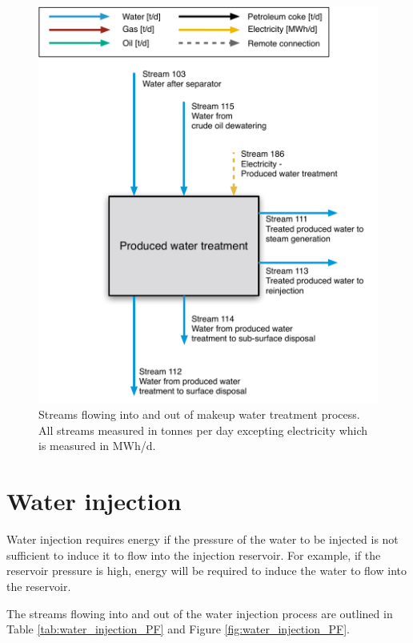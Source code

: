 \documentclass[11pt]{report}
\begin{document}
\begin{figure}
\includegraphics[width=0.8\columnwidth]{images/produced_water_treatment_PF.pdf}
\caption{Streams flowing into and out of makeup water treatment process. All streams measured in tonnes per day excepting electricity which is measured in MWh/d.}
\label{fig:makeup_water_treatment_PF}
\end{figure}

\clearpage



\section{Water injection}
\label{sec:water_injection}

Water injection requires energy if the pressure of the water to be injected is not sufficient to induce it to flow into the injection reservoir.  For example, if the reservoir pressure is high, energy will be required to induce the water to flow into the reservoir.

The streams flowing into and out of the water injection process are outlined in Table \ref{tab:water_injection_PF} and Figure \ref{fig:water_injection_PF}.
\end{document}
